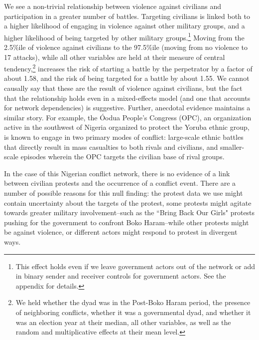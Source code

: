 We see a non-trivial relationship between violence against civilians and participation in a greater number of battles. Targeting civilians is linked both to a higher likelihood of engaging in violence against other military groups, and a higher likelihood of being targeted by other military groups.\footnote{This effect holds even if we leave government actors out of the network or add in binary sender and receiver controls for government actors. See the appendix for details.} Moving from the 2.5\%ile of violence against civilians to the 97.5\%ile (moving from no violence to 17 attacks), while all other variables are held at their measure of central tendency,\footnote{We held whether the dyad was in the Post-Boko Haram period, the presence of neighboring conflicts, whether it was a governmental dyad, and whether it was an election year at their median, all other variables, as well as the random and multiplicative effects at their mean level.} increases the risk of starting a battle by the perpetrator by a factor of about 1.58, and the risk of being targeted for a battle by about 1.55. We cannot causally say that these are the result of violence against civilians, but the fact that the relationship holds even in a mixed-effects model (and one that accounts for network dependencies) is suggestive. Further, anecdotal evidence maintains a similar story. For example, the \'{O}odua People's Congress (OPC), an organization active in the southwest of Nigeria organized to protect the Yoruba ethnic group, is known to engage in two primary modes of conflict: large-scale ethnic battles that directly result in mass casualties to both rivals and civilians, and smaller-scale episodes wherein the OPC targets the civilian base of rival groups. 

In the case of this Nigerian conflict network, there is no evidence of a link between civilian protests and the occurrence of a conflict event. There are a number of possible reasons for this null finding: the protest data we use might contain uncertainty about the targets of the protest, some protests might agitate towards greater military involvement--such as the ``Bring Back Our Girls" protests pushing for the government to confront Boko Haram--while other protests might be against violence, or different actors might respond to protest in divergent ways.

